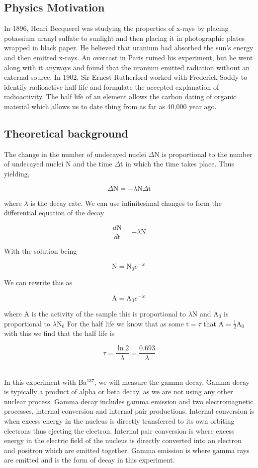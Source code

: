 \documentclass[11pt,letterpaper,onecolumn]{article}
\begin{document}
\subsection{Physics Motivation}

In 1896, Henri Becquerel was studying the properties of x-rays by placing potassium uranyl sulfate to sunlight and then placing it in photographic plates wrapped in black paper. He believed that uranium had absorbed the sun's energy and then emitted x-rays. An overcast in Paris ruined his experiment, but he went along with it anyways and found that the uranium emitted radiation without an external source. In 1902, Sir Ernest Rutherford worked with Frederick Soddy to identify radioactive half life and formulate the accepted explanation of radioactivity.
The half life of an element allows the carbon dating of organic material which allows us to date thing from as far as 40,000 year ago.~\cite{ERP,NDT} 
  
\subsection{Theoretical background}

The change in the number of undecayed nuclei $\Delta$N is proportional to the number of undecayed nuclei N and the time $\Delta$t in which the time takes place.
Thus yielding,

$$\Delta\text{N} = -\lambda\text{N}\Delta\text{t}$$

where $\lambda$ is the decay rate. We can use infinitesimal changes to form the differential equation of the decay

$$\frac{d\text{N}}{d\text{t}}= -\lambda\text{N$$}$$

With the solution being

$$\text{N} = \text{N}_0e^{-\lambda\text{t}}$$

We can rewrite this as

$$\text{A} = \text{A}_0e^{-\lambda\text{t}}$$

where A is the activity of the sample this is proportional to $\lambda\text{N}$ and $\text{A}_0$ is proportional to $\lambda\text{N}_0$  
For the half life we know that as some $\text{t}=\tau$ that $\text{A}=\frac{1}{2}\text{A}_0$ with this we find that the half life is 

$$\tau = \frac{\ln{2}}{\lambda} = \frac{0.693}{\lambda}$$ ~\cite{Parks}

In this experiment with Ba$^{137}$, we will measure the gamma decay. Gamma decay is typically a product of alpha or beta decay, as we are not using any other nuclear process. Gamma decay includes gamma emission and two electromagnetic processes, internal conversion and internal pair productions. Internal conversion is when excess energy in the nucleus is directly transferred to its own orbiting electrons thus ejecting the electron. Internal pair conversion is where excess energy in the electric field of the nucleus is directly converted into an electron and positron which are emitted together. Gamma emission is where gamma rays are emitted and is the form of decay in this experiment.~\cite{Brit}
\end{document}
